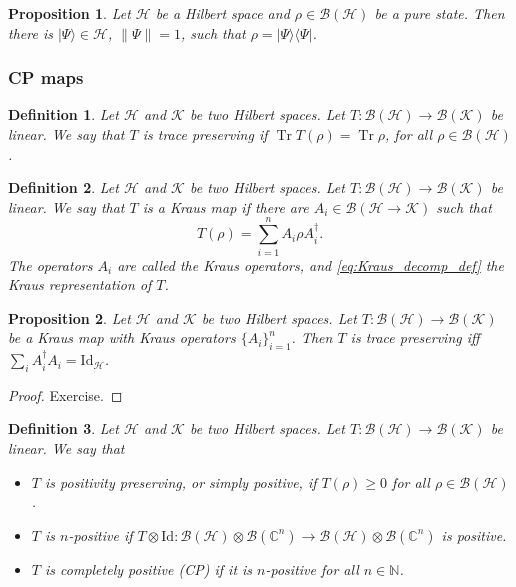 \documentclass{article}
\newtheorem{proposition}{Proposition}
\newtheorem{definition}{Definition}
\theoremstyle{definition}
\newcommand{\tr}{\operatorname{Tr}}
\newcommand{\id}{\mathrm{Id}}
\newcommand{\ket}[1]{\vert #1 \rangle}
\newcommand{\bra}[1]{\langle #1 \vert}
\newcommand{\bounded}[1]{\mathcal{B}(#1)}
\begin{document}
\begin{proposition}
  Let $\mathcal{H}$ be a Hilbert space and $\rho\in\bounded{\mathcal{H}}$ be a pure state. Then there is $\ket{\Psi}\in\mathcal{H}$, $\|\Psi\| = 1$, such that $\rho  = \ket{\Psi} \bra{\Psi}$.
\end{proposition}

\subsubsection{CP maps}

\begin{definition}
    Let $\mathcal{H}$ and $\mathcal{K}$ be two Hilbert spaces. Let $T:\bounded{\mathcal{H}}\to\bounded{\mathcal{K}}$ be linear. We say that $T$ is \emph{trace preserving} if $\tr T(\rho) = \tr \rho$, for all $\rho\in\bounded{\mathcal{H}}$.
\end{definition}

\begin{definition}
  Let $\mathcal{H}$ and $\mathcal{K}$ be two Hilbert spaces. Let $T:\bounded{\mathcal{H}}\to\bounded{\mathcal{K}}$ be linear. We say that $T$ is a Kraus map if there are $A_i\in \mathcal{B}(\mathcal{H}\rightarrow \mathcal{K})$ such that 
  \begin{equation}\label{eq:Kraus_decomp_def}
    T(\rho) = \sum_{i=1}^n A_i \rho A_i^\dagger.
  \end{equation}
  The operators $A_i$ are called the Kraus operators, and \cref{eq:Kraus_decomp_def} the Kraus representation of $T$.
\end{definition}

\begin{proposition}
    Let $\mathcal{H}$ and $\mathcal{K}$ be two Hilbert spaces. Let $T:\bounded{\mathcal{H}}\to\bounded{\mathcal{K}}$ be a Kraus map with Kraus operators $\{A_i\}_{i=1}^n$. Then $T$ is trace preserving iff $\sum_i A_i^\dagger A_i = \id_{\mathcal{H}}$.
\end{proposition}
\begin{proof}
  Exercise.
\end{proof}

\begin{definition}
  Let $\mathcal{H}$ and $\mathcal{K}$ be two Hilbert spaces. Let $T:\bounded{\mathcal{H}}\to\bounded{\mathcal{K}}$ be linear. We say that 
  \begin{itemize}
    \item $T$ is \emph{positivity preserving}, or simply \emph{positive}, if $T(\rho)\geq 0$ for all $\rho\in\bounded{\mathcal{H}}$. 
    \item $T$ is $n$-positive if $T\otimes\id: \bounded{\mathcal{H}}\otimes\bounded{\mathbb{C}^n} \to \bounded{\mathcal{H}} \otimes \bounded{\mathbb{C}^n}$ is positive.
    \item $T$ is \emph{completely positive (CP)} if it is $n$-positive for all $n\in\mathbb{N}$.
  \end{itemize}
\end{definition}
\end{document}
